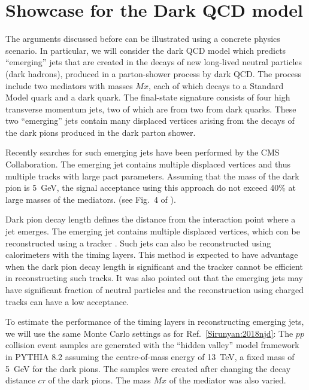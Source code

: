 \section{Showcase for the Dark QCD model}
\label{darksec}

The arguments discussed before can be illustrated using a concrete physics scenario.
In particular, we will consider the dark QCD model \cite{Bai:2013xga,Schwaller:2015gea} which predicts 
``emerging'' jets 
that are created in the decays of new long-lived neutral 
particles (dark hadrons), produced in a parton-shower process by dark QCD.
The process include  two mediators with masses $Mx$, each of which 
decays to a Standard Model quark and a dark quark. 
The final-state signature consists of four high transverse momentum jets, two of which 
are from two from dark quarks. These two ``emerging'' jets contain many displaced
vertices arising from the decays of the dark pions produced in the dark parton shower.


Recently searches for such emerging jets have been performed \cite{Sirunyan:2018njd} 
by the CMS Collaboration.
The emerging jet contains multiple displaced vertices and thus multiple 
tracks with large pact parameters. Assuming that the mass of the dark pion is 5~GeV, 
the signal acceptance using this approach  do not exceed 40\% at large masses of the mediators.
(see Fig.~4 of  \cite{Sirunyan:2018njd}).

Dark pion decay length defines the distance from the interaction point where a jet emerges. The  emerging jet contains multiple displaced vertices,
which con be reconstructed using a tracker  \cite{Sirunyan:2018njd}.
Such jets can also be reconstructed using calorimeters with the timing layers. This method is expected
to have advantage when the dark pion decay length is significant and the tracker cannot be efficient in reconstructing such tracks.
It was also pointed out \cite{Schwaller:2015gea} that the emerging jets may have significant fraction of neutral particles and the reconstruction
using charged tracks can have a low acceptance.


To estimate the performance of the timing layers in reconstructing emerging jets,
we will use the same Monte Carlo settings as for Ref.~\ref{Sirunyan:2018njd}:
The $pp$ collision event samples  are generated with the ``hidden valley'' model framework in PYTHIA 8.2 assuming the centre-of-mass energy of 13~TeV, 
a fixed mass of 5~GeV for the dark pions. The samples were created after changing the decay distance $c\tau$ of the dark pions.  
The  mass $Mx$ of the mediator was also varied. 

